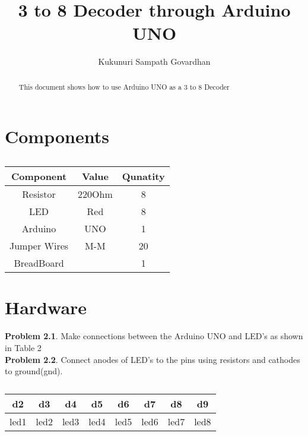 \documentclass[journal,12pt,twocolumn]{IEEEtran}
\title{
3 to 8 Decoder through Arduino UNO
}
\author{Kukunuri Sampath Govardhan}
\begin{document}
\maketitle
\tableofcontents
\begin{abstract}
This document shows how to use Arduino UNO as a 3 to 8 Decoder
\end{abstract}
\section{Components}
\begin{table}[h]
    \centering
    \begin{tabular}{| c | c | c |}
       \hline
       \textbf{Component}  &  \textbf{Value}  &  \textbf{Qunatity}\\
       \hline
         Resistor  &  220Ohm  &  8  \\
         \hline
         LED  &  Red  &  8  \\
         \hline
         Arduino  & UNO & 1  \\
         \hline
         Jumper Wires  &  M-M  &  20  \\
         \hline
         BreadBoard  &    &  1\\
         \hline
         
    \end{tabular}
    \caption{}
    \label{tab:my_label}
\end{table}
\section{Hardware}
\textbf{Problem 2.1}. Make connections between the Arduino UNO and LED's as shown in Table 2 \\

\textbf{Problem 2.2}. Connect anodes of LED's to the pins using resistors and cathodes to ground(gnd).\\
\begin{table}[h]
    \centering
    \begin{tabular}{| c | c | c | c | c | c | c | c |}
        \hline
         d2 & d3 & d4 & d5 & d6 & d7 & d8 & d9   \\
       \hline
       led1 & led2 & led3 & led4 & led5 & led6 & led7 & led8  \\
         \hline
    \end{tabular}
    \caption{}
    \label{tab:my_label}
\end{table}
\\
\end{document}
